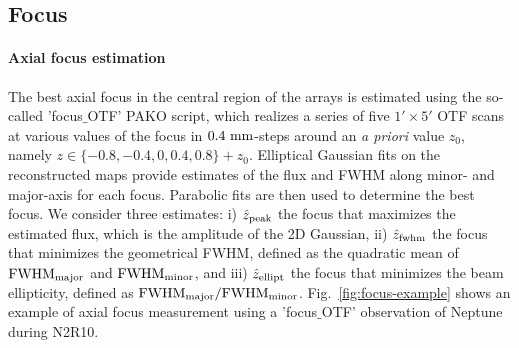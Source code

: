\subsection{Focus}
\label{se:focus}


\paragraph{Axial focus estimation}
\label{sec:focus-meas}

The best axial focus in the central region of the arrays is estimated
using the so-called 'focus$\_$OTF' PAKO script, which realizes a
series of five $1' \times 5'$ OTF scans at various values of
the focus in $0.4~\rm{mm}$-steps around an \emph{a priori} value $z_0$,
namely $z \in \{-0.8, -0.4, 0, 0.4, 0.8\} + z_0$. Elliptical Gaussian
fits on the reconstructed maps provide estimates of the flux and FWHM
along minor- and major-axis for each focus. Parabolic fits are then
used to determine the best focus. We consider three estimates: i)
$\hat z_{\rm{peak}}$ the focus that maximizes the estimated flux,
which is the amplitude of the 2D Gaussian, 
ii) $\hat z_{\rm{fwhm}}$ the focus that
minimizes the geometrical FWHM, defined as the quadratic mean of
$\rm{FWHM}_{\rm{major}}$ and $\rm{FWHM}_{\rm{minor}}$,  and iii)
$\hat z_{\rm{ellipt}}$ the focus that minimizes the beam ellipticity,
defined as $\rm{FWHM}_{\rm{major}}/\rm{FWHM}_{\rm{minor}}$.
Fig.~\ref{fig:focus-example} shows an example of
axial focus measurement using a 'focus$\_$OTF' observation of Neptune
during N2R10.

